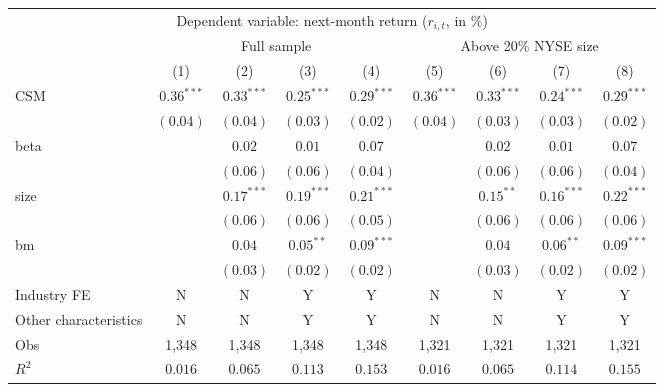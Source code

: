 \begin{tabular}{lcccccccc}
  \hline \multicolumn{9}{c}{Dependent variable: next-month return ($r_{i,t}$, in \%)} \\
 \cmidrule(l){2-9}  & \multicolumn{4}{c}{Full sample} & \multicolumn{4}{c}{Above 20\% NYSE size} \\
 \cmidrule(l){2-5} \cmidrule(l){6-9}  \vspace{5pt} & (1) & (2) & (3) & (4) & (5) & (6) & (7) & (8) \\ 
  CSM & $0.36^{***}$ & $0.33^{***}$ & $0.25^{***}$ & $0.29^{***}$ & $0.36^{***}$ & $0.33^{***}$ & $0.24^{***}$ & $0.29^{***}$ \\ 
   & $(0.04)$ & $(0.04)$ & $(0.03)$ & $(0.02)$ & $(0.04)$ & $(0.03)$ & $(0.03)$ & $(0.02)$ \\ 
  beta &  & $0.02$ & $0.01$ & $0.07$ &  & $0.02$ & $0.01$ & $0.07$ \\ 
   &  & $(0.06)$ & $(0.06)$ & $(0.04)$ &  & $(0.06)$ & $(0.06)$ & $(0.04)$ \\ 
  size &  & $0.17^{***}$ & $0.19^{***}$ & $0.21^{***}$ &  & $0.15^{**}$ & $0.16^{***}$ & $0.22^{***}$ \\ 
   &  & $(0.06)$ & $(0.06)$ & $(0.05)$ &  & $(0.06)$ & $(0.06)$ & $(0.06)$ \\ 
  bm &  & $0.04$ & $0.05^{**}$ & $0.09^{***}$ &  & $0.04$ & $0.06^{**}$ & $0.09^{***}$ \\ 
   \vspace{5pt} &  & $(0.03)$ & $(0.02)$ & $(0.02)$ &  & $(0.03)$ & $(0.02)$ & $(0.02)$ \\ 
  Industry FE & N & N & Y & Y & N & N & Y & Y \\ 
   \vspace{5pt}Other characteristics & N & N & Y & Y & N & N & Y & Y \\ 
  Obs & 1,348 & 1,348 & 1,348 & 1,348 & 1,321 & 1,321 & 1,321 & 1,321 \\ 
  $R^2$ & $0.016$ & $0.065$ & $0.113$ & $0.153$ & $0.016$ & $0.065$ & $0.114$ & $0.155$ \\ 
   \bottomrule\end{tabular}
